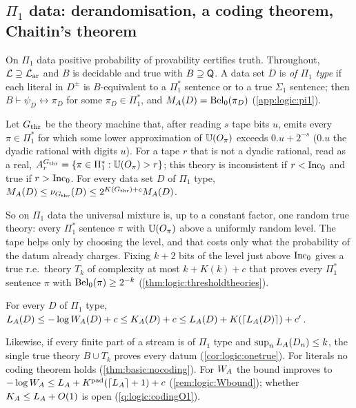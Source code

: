 \subsection{\texorpdfstring{$\Pi_1$}{Pi1} data: derandomisation, a coding theorem, Chaitin's theorem}\label{sec:logic:pi1}

On $\Pi_1$ data positive probability of provability certifies truth. Throughout, $\mathcal L\supseteq\mathcal{L}_{\mathrm{ar}}$ and $B$ is decidable and true with $B\supseteq\mathsf{Q}$. A data set $D$ is \emph{of $\Pi_1$ type} if each literal in $D^\pm$ is $B$-equivalent to a $\Pi_1^*$ sentence or to a true $\Sigma_1$ sentence; then $B\vdash\psi_D\leftrightarrow\pi_D$ for some $\pi_D\in\Pi_1^*$, and $M_{A}(D)=\mathrm{Bel}_0(\pi_D)$ (\cref{app:logic:pi1}).

\begin{theorem}\label{thm:logic:threshold}
Let $G_{\mathrm{thr}}$ be the theory machine that, after reading $s$ tape bits $u$, emits every $\pi\in\Pi_1^*$ for which some lower approximation of $\mathbb{U}(O_\pi)$ exceeds $0.u+2^{-s}$ ($0.u$ the dyadic rational with digits $u$). For a tape $r$ that is not a dyadic rational, read as a real, $A^{G_{\mathrm{thr}}}_r=\{\pi\in\Pi_1^*:\mathbb{U}(O_\pi)>r\}$; this theory is inconsistent if $r<\mathrm{Inc}_0$ and true if $r>\mathrm{Inc}_0$. For every data set $D$ of $\Pi_1$ type, $M_{A}(D)\le\nu_{G_{\mathrm{thr}}}(D)\le2^{K(G_{\mathrm{thr}})+c}M_{A}(D)$.
\end{theorem}

So on $\Pi_1$ data the universal mixture is, up to a constant factor, one random true theory: every $\Pi_1^*$ sentence $\pi$ with $\mathbb{U}(O_\pi)$ above a uniformly random level. The tape helps only by choosing the level, and that costs only what the probability of the datum already charges. Fixing $k+2$ bits of the level just above $\mathrm{Inc}_0$ gives a true r.e.\ theory $T_k$ of complexity at most $k+K(k)+c$ that proves every $\Pi_1^*$ sentence $\pi$ with $\mathrm{Bel}_0(\pi)\ge2^{-k}$ (\cref{thm:logic:thresholdtheories}).

\begin{corollary}\label{cor:logic:coding}
For every $D$ of $\Pi_1$ type, $L_{A}(D)\le-\log W_{A}(D)+c\le K_{A}(D)+c\le L_{A}(D)+K(\lceil L_{A}(D)\rceil)+c'$.
\end{corollary}

Likewise, if every finite part of a stream is of $\Pi_1$ type and $\sup_nL_{A}(D_n)\le k$, the single true theory $B\cup T_k$ proves every datum (\cref{cor:logic:onetrue}). For literals no coding theorem holds (\cref{thm:basic:nocoding}). For $W_{A}$ the bound improves to $-\log W_{A}\le L_{A}+K^{\mathrm{pad}}(\lceil L_{A}\rceil+1)+c$ (\cref{rem:logic:Wbound}); whether $K_{A}\le L_{A}+O(1)$ is open (\cref{q:logic:codingO1}).

